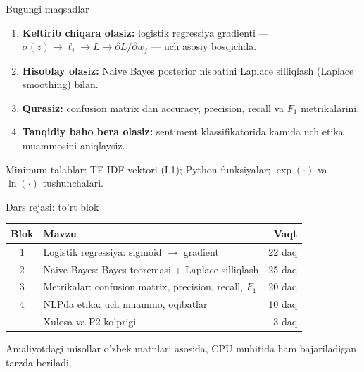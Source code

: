 \documentclass[aspectratio=169,11pt]{beamer}
\begin{document}
\begin{frame}{Bugungi maqsadlar}
  \begin{enumerate}\setlength{\itemsep}{7pt}
    \item \textbf{Keltirib chiqara olasiz:} logistik regressiya gradienti ---
          $\sigma(z)\!\to\!\ell_i\!\to\!L\!\to\!\partial L/\partial w_j$ ---
          uch asosiy bosqichda. 
    \item \textbf{Hisoblay olasiz:} Naive Bayes posterior nisbatini
          Laplace silliqlash (Laplace smoothing) bilan.
    \item \textbf{Qurasiz:} confusion matrix dan accuracy, precision, recall va $F_1$ metrikalarini.
    \item \textbf{Tanqidiy baho bera olasiz:} sentiment klassifikatorida
          kamida uch etika muammosini aniqlaysiz.
  \end{enumerate}
  \vspace{5pt}
  \begin{tcolorbox}[defbox,title=Oldingi bilimlar]
    \small
   Minimum talablar: TF-IDF vektori (L1);\; Python funksiyalar;\;
    $\exp(\cdot)$ va $\ln(\cdot)$ tushunchalari.
  \end{tcolorbox}
\end{frame}

\begin{frame}{Dars rejasi: to'rt blok}
  \begin{center}
    \small
    \begin{tabular}{clr}
      \toprule
      Blok & Mavzu & Vaqt \\
      \midrule
      1 & Logistik regressiya: sigmoid $\to$ gradient & 22 daq \\
      2 & Naive Bayes: Bayes teoremasi + Laplace silliqlash & 25 daq \\
      3 & Metrikalar: confusion matrix, precision, recall, $F_1$ & 20 daq \\
      4 & NLPda etika: uch muammo, oqibatlar & 10 daq \\
      \midrule
        & Xulosa va P2 ko'prigi & 3 daq \\
      \bottomrule
    \end{tabular}
  \end{center}
  \vspace{4pt}
  \small\textcolor{halfgray}{Amaliyotdagi misollar o'zbek matnlari asosida, CPU muhitida ham bajariladigan tarzda beriladi.}
\end{frame}
\end{document}
